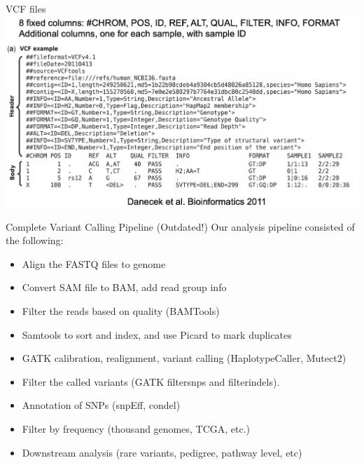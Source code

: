 \documentclass[
  ignorenonframetext,
]{beamer}
\providecommand{\tightlist}{%
  \setlength{\itemsep}{0pt}\setlength{\parskip}{0pt}}
\begin{document}
\begin{frame}{VCF files}
\label{vcf-files}
\includegraphics{figs/vcf_format.png}
\end{frame}

\begin{frame}{Complete Variant Calling Pipeline (Outdated!)}
\label{complete-variant-calling-pipeline-outdated}
Our analysis pipeline consisted of the following:

\begin{itemize}
\tightlist
\item
  Align the FASTQ files to genome
\item
  Convert SAM file to BAM, add read group info
\item
  Filter the reads based on quality (BAMTools)
\item
  Samtools to sort and index, and use Picard to mark duplicates
\item
  GATK calibration, realignment, variant calling (HaplotypeCaller,
  Mutect2)
\item
  Filter the called variants (GATK filtersnps and filterindels).
\item
  Annotation of SNPs (snpEff, condel)
\item
  Filter by frequency (thousand genomes, TCGA, etc.)
\item
  Downstream analysis (rare variants, pedigree, pathway level, etc)
\end{itemize}
\end{frame}
\end{document}
